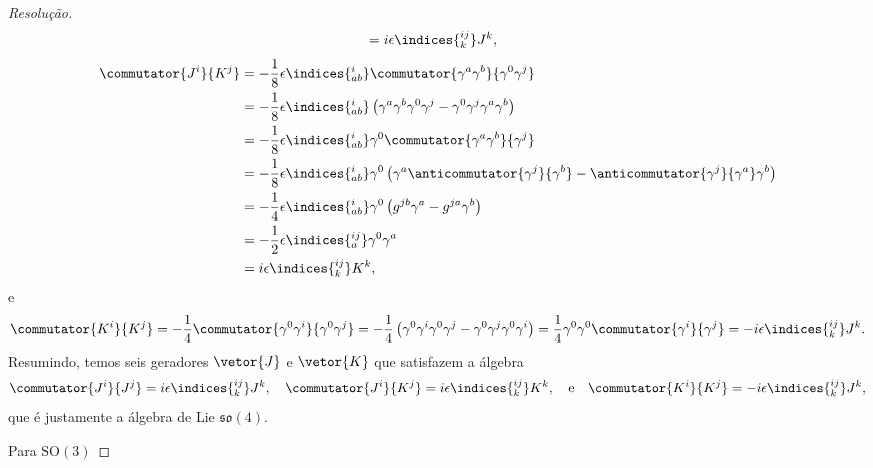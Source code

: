 \begin{proof}[Resolução]
\begin{align*}
                              &= i \epsilon\indices{^{ij}_k}J^k,
    \end{align*}
    \begin{align*}
        \commutator{J^i}{K^j} &= -\frac{1}{8} \epsilon\indices{^i_{ab}} \commutator{\gamma^a \gamma^b}{\gamma^0\gamma^j}\\
                              &= -\frac{1}{8} \epsilon\indices{^i_{ab}} \left(\gamma^a \gamma^b \gamma^0 \gamma^j - \gamma^0 \gamma^j \gamma^a \gamma^b\right)\\
                              &= -\frac{1}{8} \epsilon\indices{^i_{ab}} \gamma^0\commutator{\gamma^a \gamma^b}{\gamma^j}\\
                              &= -\frac{1}{8}\epsilon\indices{^i_{ab}} \gamma^0\left(\gamma^a\anticommutator{\gamma^j}{\gamma^b} - \anticommutator{\gamma^j}{\gamma^a} \gamma^b\right)\\
                              &= -\frac{1}{4}\epsilon\indices{^i_{ab}} \gamma^0\left(g^{jb}\gamma^a- g^{ja} \gamma^b\right)\\
                              &= -\frac12 \epsilon\indices{^{ij}_a} \gamma^0 \gamma^a\\
                              &= i\epsilon\indices{^{ij}_k}K^k,
    \end{align*}
    e
    \begin{equation*}
        \commutator{K^i}{K^j} = -\frac{1}{4}\commutator{\gamma^0 \gamma^i}{\gamma^0\gamma^j}
        = -\frac{1}{4}\left(\gamma^0 \gamma^i \gamma^0 \gamma^j - \gamma^0 \gamma^j \gamma^0 \gamma^i\right)
        = \frac{1}{4}\gamma^0 \gamma^0 \commutator{\gamma^i}{\gamma^j}
        = -i\epsilon\indices{^{ij}_k} J^k.
    \end{equation*}
    Resumindo, temos seis geradores \(\vetor{J}\) e \(\vetor{K}\) que satisfazem a álgebra
    \begin{equation*}
        \commutator{J^i}{J^j} = i \epsilon\indices{^{ij}_k} J^k,\quad
        \commutator{J^i}{K^j} = i \epsilon\indices{^{ij}_k} K^k,\quad\text{e}\quad
        \commutator{K^i}{K^j} = -i \epsilon\indices{^{ij}_k} J^k,
    \end{equation*}
    que é justamente a álgebra de Lie \(\mathfrak{so}(4).\)

    Para \(\mathrm{SO}(3)\) 
\end{proof}
